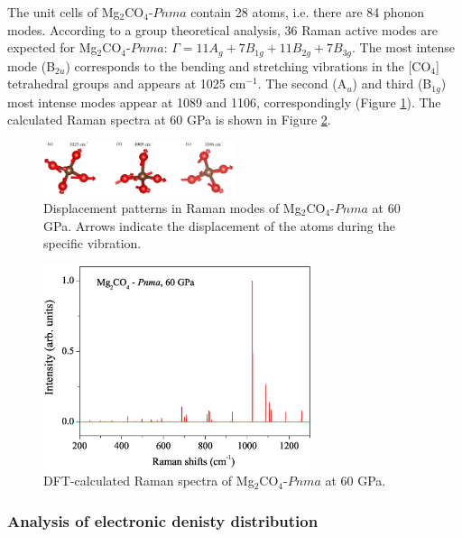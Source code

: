 \documentclass[a4paperm]{article}
\begin{document}
The unit cells of Mg$_2$CO$_4$-$Pnma$ contain 28 atoms, i.e. there are 84 phonon modes. 
According to a group theoretical analysis, 36 Raman active modes are expected for Mg$_2$CO$_4$-$Pnma$: $\Gamma = 11A_g + 7B_{1g} + 11B_{2g} + 7B_{3g}$. 
The most intense mode (B$_{2u}$) corresponds to the bending and stretching vibrations in the [CO$_4$] tetrahedral groups and appears at 1025 cm$^{-1}$. 
The second (A$_u$) and third (B$_{1g}$) most intense modes appear at 1089 and 1106, correspondingly (Figure \ref{displ}). The calculated Raman spectra at 60 GPa is shown in Figure \ref{raman}.

\begin{figure}[H]
	\includegraphics[width=0.5\textwidth]{dis_pat} \centering
	\caption{Displacement patterns in Raman modes of Mg$_2$CO$_4$-$Pnma$ at 60 GPa. Arrows indicate the displacement of the atoms during the specific vibration.} \label{displ}
\end{figure}

\begin{figure}[H]
	\includegraphics[width=0.7\textwidth]{raman_mg2co4} \centering
	\caption{DFT-calculated Raman spectra of Mg$_2$CO$_4$-$Pnma$ at 60 GPa.} \label{raman}
\end{figure}


\subsubsection*{Analysis of electronic denisty distribution}
\end{document}
